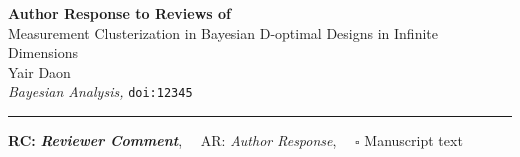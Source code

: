 \documentclass{article}
\def\papertitle{Measurement Clusterization in Bayesian D-optimal Designs in Infinite Dimensions}
\def\authors{Yair Daon}
\def\journal{Bayesian Analysis}
\def\doi{12345}
\providecommand{\lettertitle}{Author Response to Reviews of}
\providecommand{\papertitle}{Title}
\providecommand{\authors}{Authors}
\providecommand{\journal}{Journal}
\providecommand{\doi}{--}
\begin{document}
{\Large\bf \lettertitle}\\[1em]
{\huge \papertitle}\\[1em]
{\authors}\\
{\it \journal, }\texttt{doi:\doi}\\
\hrule

\hfill {\bfseries RC:} \textbf{\textit{Reviewer Comment}},\(\quad\) AR: \emph{Author Response}, \(\quad\square\) Manuscript text







\end{document}
